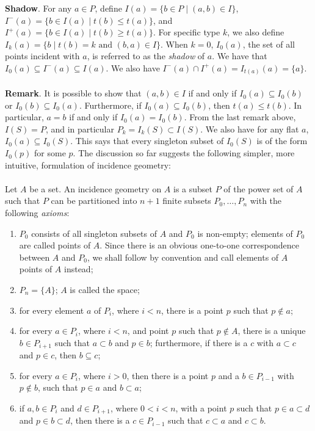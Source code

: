 \documentclass[12pt]{article}
\begin{document}
\textbf{Shadow}.  For any $a\in P$, define $I(a)=\lbrace b\in P\mid (a,b)\in I\rbrace$, $I^{-}(a)=\lbrace b\in I(a)\mid t(b)\leq t(a)\rbrace$, and $I^{+}(a)=\lbrace b\in I(a)\mid t(b)\geq t(a)\rbrace$.  For specific type $k$, we also define $I_k(a)=\lbrace b\mid t(b)=k\mbox{ and }(b,a)\in I\rbrace$.  When $k=0$, $I_0(a)$, the set of all points incident with $a$, is referred to as the \emph{shadow} of $a$. We have that $I_0(a)\subseteq
I^{-}(a)\subseteq I(a)$. We also have $I^{-}(a)\cap I^{+}(a)=I_{t(a)}(a)=\lbrace a\rbrace$.
\\\\
\textbf{Remark}. It is possible to show that $(a,b)\in I$ if and only if  $I_0(a)\subseteq I_0(b)$ or $I_0(b)\subseteq I_0(a)$.  Furthermore, if $I_0(a)\subseteq I_0(b)$, then $t(a)\leq t(b)$.  In particular, $a=b$ if and only if  $I_0(a)=I_0(b)$.  From the last remark above, $I(S)=P$, and in particular $P_k=I_k(S)\subset I(S)$.  We also have for any flat $a$, $I_0(a)\subseteq I_0(S)$.  This says that every singleton subset of $I_0(S)$ is of the form $I_0(p)$ for some $p$.  The discussion so far suggests the following simpler, more intuitive, formulation of incidence geometry:
\\\\
Let $A$ be a set.  An incidence geometry on $A$ is a subset $P$ of the power set of $A$ such that $P$ can be partitioned into $n+1$ finite subsets $P_0,\ldots,P_n$ with the following \emph{axioms}:

\begin{enumerate}
\item $P_0$ consists of all singleton subsets of $A$ and $P_0$ is non-empty; elements of $P_0$ are called points of $A$.  Since there is an obvious one-to-one correspondence between $A$ and $P_0$, we shall follow by convention and call elements of $A$ points of $A$ instead;
\item $P_n=\lbrace A\rbrace$; $A$ is called the space;
\item for every element $a$ of $P_i$, where $i<n$, there is a point $p$ such that $p\notin a$;
\item for every $a\in P_i$, where $i<n$, and point $p$ such that $p\notin A$, there is a unique $b\in P_{i+1}$ such that $a\subset b$ and $p\in b$; furthermore, if there is a $c$ with $a\subset c$ and $p\in c$, then $b\subseteq c$;
\item for every $a\in P_i$, where $i>0$, then there is a point $p$ and a $b\in P_{i-1}$ with $p\notin b$, such that $p\in a$ and $b\subset a$;
\item if $a,b\in P_i$ and $d\in P_{i+1}$, where $0<i<n$, with a point $p$ such that $p\in a\subset d$ and $p\in b\subset d$, then there is a $c\in P_{i-1}$ such that $c\subset a$ and $c\subset b$.
\end{enumerate}
\end{document}
